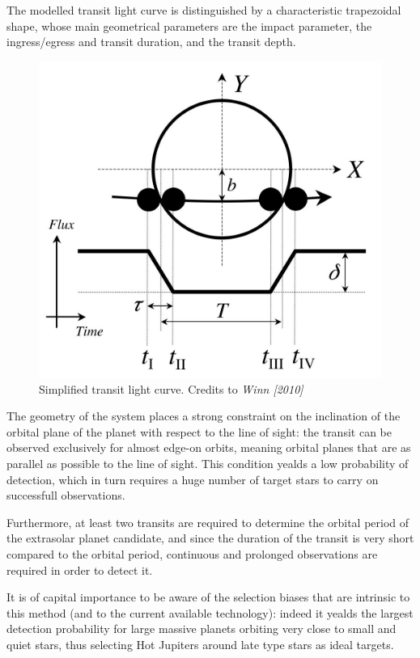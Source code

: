 \documentclass[a4paper,11pt,twocolumn]{article}
\begin{document}
The modelled transit light curve is distinguished by a characteristic trapezoidal shape, whose main geometrical parameters are the impact parameter, the ingress/egress and transit duration, and the transit depth.
\begin{figure}[H]
    \centering  
    \includegraphics[scale=0.18, angle=0]{../pictures/transit.jpeg}
    \caption{Simplified transit light curve. Credits to \textit{Winn [2010]}}
\end{figure}
The geometry of the system places a strong constraint on the inclination of the orbital plane of the planet with respect to the line of sight: the transit can be observed exclusively for almost edge-on orbits, meaning orbital planes that are as parallel as possible to the line of sight. This condition yealds a low probability of detection, which in turn requires a huge number of target stars to carry on successfull observations.

Furthermore, at least two transits are required to determine the orbital period of the extrasolar planet candidate, and since the duration of the transit is very short compared to the orbital period, continuous and prolonged observations are required in order to detect it.

It is of capital importance to be aware of the selection biases that are intrinsic to this method (and to the current available technology): indeed it yealds the largest detection probability for large massive planets orbiting very close to small and quiet stars, thus selecting Hot Jupiters around late type stars as ideal targets.
\end{document}
